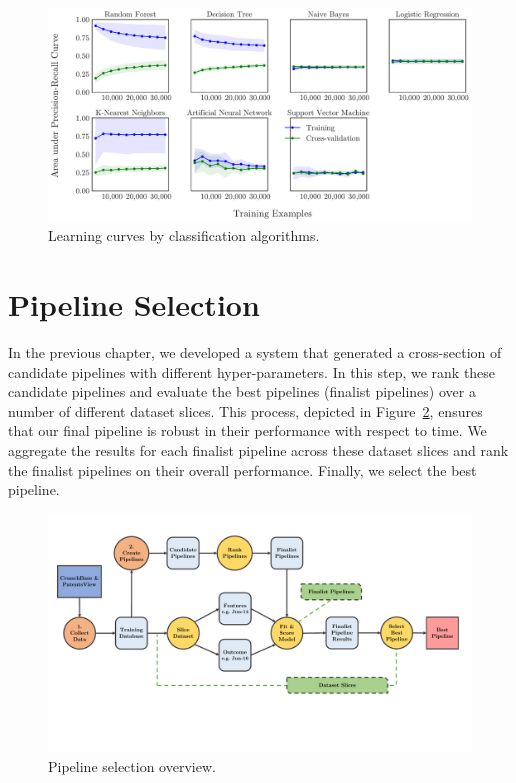 \documentclass[../thesis/thesis.tex]{subfiles}
\begin{document}
\begin{figure}[!htb]
    \centering
    \includegraphics[width=\textwidth]{../figures/design/learning_curves_classifier}
    \caption[Learning curves by classification algorithms]{Learning curves by classification algorithms.}
    \label{fig:design:create_learning_curves}
\end{figure}

\section{Pipeline Selection}

In the previous chapter, we developed a system that generated a cross-section of candidate pipelines with different hyper-parameters. In this step, we rank these candidate pipelines and evaluate the best pipelines (finalist pipelines) over a number of different dataset slices. This process, depicted in Figure~\ref{fig:design:pipeline_selection}, ensures that our final pipeline is robust in their performance with respect to time. We aggregate the results for each finalist pipeline across these dataset slices and rank the finalist pipelines on their overall performance. Finally, we select the best pipeline.

\begin{figure}[!htb]
    \centering
    \includegraphics[width=\textwidth]{../figures/design/flowchart_pipeline_selection}
    \caption[Pipeline selection flowchart]{Pipeline selection overview.}
    \label{fig:design:pipeline_selection}
\end{figure}
\end{document}
